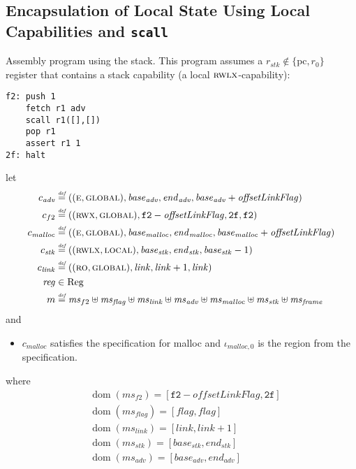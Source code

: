 \documentclass[a4paper]{article}
\newcommand{\defeq}{\stackrel{\textit{\tiny{def}}}{=}}
\DeclareMathOperator{\dom}{dom}
\newcommand{\var}[1]{\mathit{#1}}
\newcommand{\hs}{\var{ms}}
\newcommand{\ms}{\hs}
\newcommand{\pcreg}{\mathrm{pc}}
\newcommand{\start}{\var{base}}
\newcommand{\addrend}{\var{end}}
\newcommand{\reg}{\var{reg}}
\newcommand{\adv}{\var{adv}}
\newcommand{\link}{\var{link}}
\newcommand{\stk}{\var{stk}}
\newcommand{\flag}{\var{flag}}
\newcommand{\olf}{\var{offsetLinkFlag}}
\newcommand{\codelabel}[1]{\mathit{#1}}
\newcommand{\malloc}{\codelabel{malloc}}
\newcommand{\plaindom}[1]{\mathrm{#1}}
\newcommand{\Regs}{\plaindom{Reg}}
\newcommand{\plainperm}[1]{\textsc{#1}}
\newcommand{\readonly}{\plainperm{ro}}
\newcommand{\entry}{\plainperm{e}}
\newcommand{\rwx}{\plainperm{rwx}}
\newcommand{\rwlx}{\plainperm{rwlx}}
\newcommand{\local}{\plainperm{local}}
\newcommand{\glob}{\plainperm{global}}
\begin{document}
\subsection{Encapsulation of Local State Using Local Capabilities and \texttt{scall}}
\label{subsec:example-loc-cap}

Assembly program using the stack. This program assumes a $r_\stk \not\in \{\pcreg,r_0\}$ register that contains a stack capability (a local $\rwlx$-capability):
\begin{verbatim}
f2: push 1
    fetch r1 adv
    scall r1([],[])
    pop r1
    assert r1 1
2f: halt
\end{verbatim}
              
\begin{lemma}
  \label{lem:correctness-f2}
  let
  \begin{align*}
    c_{\var{adv}} & \defeq ((\entry,\glob),\start_{\adv},\addrend_{\adv},\start_{\adv}+\olf) \\
    c_{f2} & \defeq ((\rwx,\glob),\mathtt{f2}-\olf,\mathtt{2f},\mathtt{f2}) \\
    c_\malloc & \defeq ((\entry,\glob),\start_\malloc,\addrend_\malloc,\start_\malloc+\olf) \\
    c_{\var{stk}} & \defeq ((\rwlx,\local),\start_\stk,\addrend_\stk,\start_\stk-1) \\
    c_\link & \defeq ((\readonly,\glob),\link,\link+1,\link)\\
    \reg & \in \Regs \\
    m & \defeq \hs_{f2} \uplus 
        \hs_\flag \uplus                
        \ms_{\var{link}} \uplus 
        \hs_\adv \uplus 
        \ms_{\malloc} \uplus 
        \ms_{\var{stk}} \uplus
        \ms_{\var{frame}} 
  \end{align*}
  and
  \begin{itemize}
  \item $c_\malloc$ satisfies the specification for malloc and $\iota_{\malloc,0}$ is the region from the specification.
  \end{itemize}
  where 
  \begin{align*}
    &\dom(\hs_{f2}) = [\mathtt{f2}-\olf,\mathtt{2f}] \\
    &\dom(\hs_\flag) = [\flag,\flag] \\
    &\dom(\ms_\link) = [\link,\link+1]\\
    &\dom(\ms_\stk) = [\start_\stk, \addrend_\stk]\\
    &\dom(\hs_{\adv}) = [\start_\adv,\addrend_\adv] \\

\end{align*}
\end{lemma}
\end{document}
